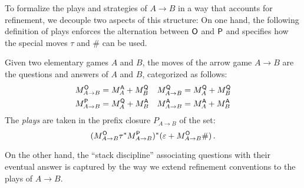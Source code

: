 
To formalize the plays and strategies of $A \rightarrow B$
in a way that accounts for refinement,
we decouple two aspects of this structure:
On one hand,
the following definition of plays
enforces the alternation between $ \mathsf{O} $ and $ \mathsf{P} $
and specifies how the special moves $\tau$ and $\#$ can be used.

\begin{definition}
Given two elementary games $A$ and $B$,
the moves of the arrow game $A \rightarrow B$
are the questions and answers of $A$ and $B$,
categorized as follows:
\begin{align*}
  M_{A \rightarrow B}^{ \mathsf{O} } &= M_A^{ \mathsf{A} } + M_B^{ \mathsf{Q} } &
  M_{A \rightarrow B}^{ \mathsf{Q} } &= M_A^{ \mathsf{Q} } + M_B^{ \mathsf{Q} } \\
  M_{A \rightarrow B}^{ \mathsf{P} } &= M_A^{ \mathsf{Q} } + M_B^{ \mathsf{A} } &
  M_{A \rightarrow B}^{ \mathsf{A} } &= M_A^{ \mathsf{A} } + M_B^{ \mathsf{A} }
\end{align*}
The \emph{plays} are taken in
the prefix closure $P_{A \rightarrow B}$ of the set:
\[
    (M_{A \rightarrow B}^{ \mathsf{O} } \tau^*
     M_{A \rightarrow B}^{ \mathsf{P} })^*
    (\varepsilon + M_{A \rightarrow B}^{ \mathsf{O} } \#) \,.
\]
\end{definition}

On the other hand,
the ``stack discipline'' associating questions
with their eventual answer is captured by
the way we extend refinement conventions to
the plays of $A \rightarrow B$.

